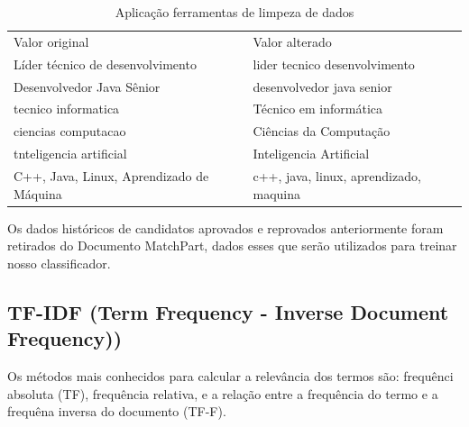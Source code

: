 \documentclass[conference]{IEEEtran}
\begin{document}
\begin{table}[h]
 \centering
 {\renewcommand\arraystretch{1.25}
\caption{Aplicação ferramentas de limpeza de dados}
 \begin{tabular}{ l l }
  \cline{1-1}\cline{2-2}  
    \multicolumn{1}{|p{3.5cm}|}{\cellcolor{}Valor original \centering } &
    \multicolumn{1}{p{3.5cm}|}{\cellcolor{}Valor alterado \centering }
  \\  
  \cline{1-1}\cline{2-2}  
    \multicolumn{1}{|p{3.0cm}|}{Líder técnico de desenvolvimento } &
    \multicolumn{1}{p{4.217cm}|}{ lider tecnico desenvolvimento}
  \\  
  \cline{1-1}\cline{2-2}  
    \multicolumn{1}{|p{3.0cm}|}{  Desenvolvedor Java Sênior } &
    \multicolumn{1}{p{4.217cm}|}{ desenvolvedor java senior}
  \\  
  \cline{1-1}\cline{2-2}  
    \multicolumn{1}{|p{3.0cm}|}{  tecnico informatica} &
    \multicolumn{1}{p{4.217cm}|}{Técnico em informática }
  \\  
  \cline{1-1}\cline{2-2}  
    \multicolumn{1}{|p{3.0cm}|}{  ciencias computacao} &
    \multicolumn{1}{p{4.217cm}|}{ Ciências da Computação }
  \\  
  \cline{1-1}\cline{2-2}  
    \multicolumn{1}{|p{3.0cm}|}{  tnteligencia artificial} &
    \multicolumn{1}{p{4.217cm}|}{ Inteligencia Artificial}
  \\  
  \cline{1-1}\cline{2-2}  
    \multicolumn{1}{|p{3.0cm}|}{  C++, Java, Linux, Aprendizado de Máquina  } &
    \multicolumn{1}{p{4.217cm}|}{ c++, java, linux, aprendizado, maquina }
  \\  
  \hline
 \end{tabular} }
\end{table}


Os dados históricos de candidatos aprovados e reprovados anteriormente foram retirados do Documento MatchPart, dados esses que serão utilizados para treinar nosso classificador. 


	\subsection{TF-IDF (Term Frequency - Inverse Document Frequency))}

Os métodos mais conhecidos para calcular a relevância dos termos são: frequênci  absoluta (TF), frequência relativa, e a relação entre a frequência do termo e a frequêna
  inversa do documento (TF-F).
  
\end{document}
